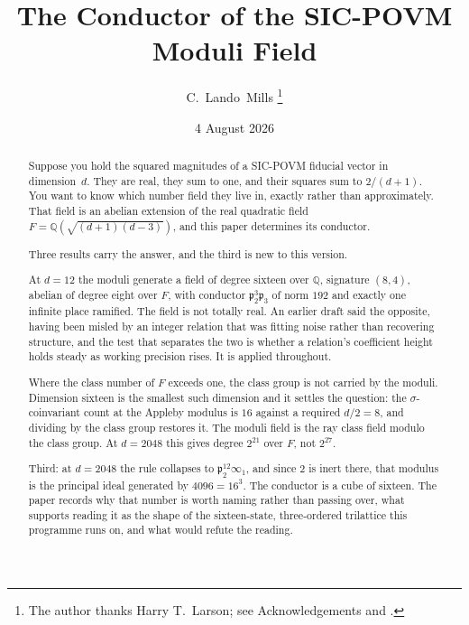 \documentclass[12pt,a4paper]{article}
\newcommand{\Fd}{F}
\newcommand{\pt}{\mathfrak{p}_2}
\begin{document}
\title{\textbf{The Conductor of the SIC-POVM Moduli Field}}

\author{C.\ Lando\ Mills%
\thanks{The author thanks Harry T.\ Larson; see Acknowledgements and \cite{Larson1961}.}}

\date{4 August 2026}

\maketitle

\begin{abstract}
Suppose you hold the squared magnitudes of a SIC-POVM fiducial vector in
dimension~$d$. They are real, they sum to one, and their squares sum to
$2/(d+1)$. You want to know which number field they live in, exactly rather
than approximately. That field is an abelian extension of the real quadratic
field $\Fd = \mathbb{Q}(\sqrt{(d+1)(d-3)})$, and this paper determines its
conductor.

Three results carry the answer, and the third is new to this version.

At $d=12$ the moduli generate a field of degree sixteen over $\mathbb{Q}$,
signature $(8,4)$, abelian of degree eight over $\Fd$, with conductor
$\pt^3\mathfrak{p}_3$ of norm $192$ and exactly one infinite place ramified. The
field is not totally real. An earlier draft said the opposite, having been
misled by an integer relation that was fitting noise rather than recovering
structure, and the test that separates the two is whether a relation's
coefficient height holds steady as working precision rises. It is applied
throughout.

Where the class number of $\Fd$ exceeds one, the class group is not carried by
the moduli. Dimension sixteen is the smallest such dimension and it settles the
question: the $\sigma$-coinvariant count at the Appleby modulus is $16$ against
a required $d/2 = 8$, and dividing by the class group restores it. The moduli
field is the ray class field modulo the class group. At $d=2048$ this gives
degree $2^{21}$ over $\Fd$, not $2^{27}$.

Third: at $d=2048$ the rule collapses to $\pt^{12}\infty_1$, and since $2$ is
inert there, that modulus is the principal ideal generated by $4096 = 16^{3}$.
The conductor is a cube of sixteen. The paper records why that number is worth
naming rather than passing over, what supports reading it as the shape of the
sixteen-state, three-ordered trilattice this programme runs on, and what would
refute the reading.
\end{abstract}
\end{document}

